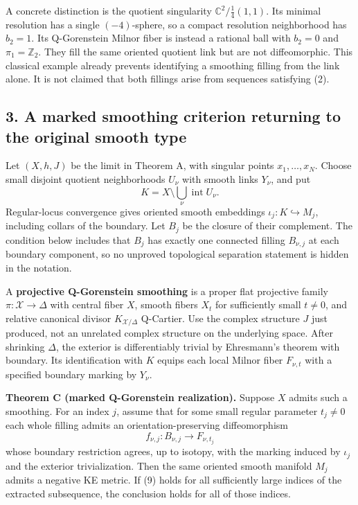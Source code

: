 \documentclass[
  11pt,
]{article}
\begin{document}
A concrete distinction is the quotient singularity
\(\mathbb C^2/\frac14(1,1)\). Its minimal resolution has a single
\((-4)\)-sphere, so a compact resolution neighborhood has \(b_2=1\). Its
Q-Gorenstein Milnor fiber is instead a rational ball with \(b_2=0\) and
\(\pi_1=\mathbb Z_2\). They fill the same oriented quotient link but are
not diffeomorphic. This classical example already prevents identifying a
smoothing filling from the link alone. It is not claimed that both
fillings arise from sequences satisfying (2).

\hypertarget{a-marked-smoothing-criterion-returning-to-the-original-smooth-type}{%
\subsection{3. A marked smoothing criterion returning to the original
smooth
type}\label{a-marked-smoothing-criterion-returning-to-the-original-smooth-type}}

Let \((X,h,J)\) be the limit in Theorem A, with singular points
\(x_1,\ldots,x_N\). Choose small disjoint quotient neighborhoods
\(U_\nu\) with smooth links \(Y_\nu\), and put \[
                    K=X\setminus\bigcup_\nu\operatorname{int}U_\nu.
\] Regular-locus convergence gives oriented smooth embeddings
\(\iota_j:K\hookrightarrow M_j\), including collars of the boundary. Let
\(B_j\) be the closure of their complement. The condition below includes
that \(B_j\) has exactly one connected filling \(B_{\nu,j}\) at each
boundary component, so no unproved topological separation statement is
hidden in the notation.

A \textbf{projective Q-Gorenstein smoothing} is a proper flat projective
family \(\pi:\mathcal X\to\Delta\) with central fiber \(X\), smooth
fibers \(X_t\) for sufficiently small \(t\ne0\), and relative canonical
divisor \(K_{\mathcal X/\Delta}\) Q-Cartier. Use the complex structure
\(J\) just produced, not an unrelated complex structure on the
underlying space. After shrinking \(\Delta\), the exterior is
differentiably trivial by Ehresmann's theorem with boundary. Its
identification with \(K\) equips each local Milnor fiber \(F_{\nu,t}\)
with a specified boundary marking by \(Y_\nu\).

\textbf{Theorem C (marked Q-Gorenstein realization).} Suppose \(X\)
admits such a smoothing. For an index \(j\), assume that for some small
regular parameter \(t_j\ne0\) each whole filling admits an
orientation-preserving diffeomorphism \[
                    f_{\nu,j}:B_{\nu,j}\longrightarrow F_{\nu,t_j}
 \tag{9}
\] whose boundary restriction agrees, up to isotopy, with the marking
induced by \(\iota_j\) and the exterior trivialization. Then the same
oriented smooth manifold \(M_j\) admits a negative KE metric. If (9)
holds for all sufficiently large indices of the extracted subsequence,
the conclusion holds for all of those indices.
\end{document}

